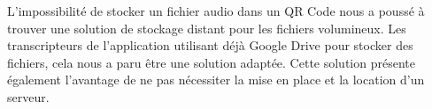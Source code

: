 \par
L'impossibilité de stocker un fichier audio dans un QR Code nous a poussé à trouver une solution de stockage distant pour les fichiers volumineux. Les transcripteurs de l'application utilisant déjà Google Drive pour stocker des fichiers, cela nous a paru être une solution adaptée. Cette solution présente également l'avantage de ne pas nécessiter la mise en place et la location d'un serveur.